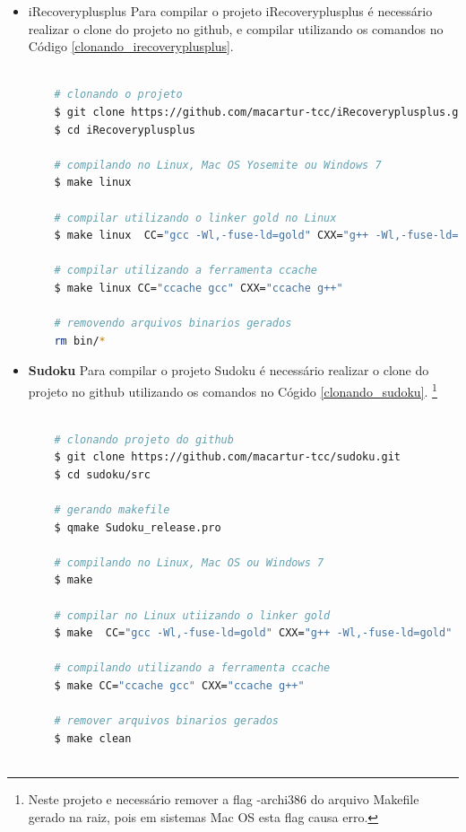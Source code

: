 \begin{itemize}
       \item {iRecoveryplusplus}
        \subitem Para compilar o projeto iRecoveryplusplus é necessário
 realizar o clone do projeto no github, e compilar utilizando os comandos no Código 
\ref{clonando_irecoveryplusplus}.


\begin{lstlisting}[language=bash, caption={Clonado e compilando o projeto iRecoveryplusplus},
                  label=clonando_irecoveryplusplus]

    # clonando o projeto
    $ git clone https://github.com/macartur-tcc/iRecoveryplusplus.git 
    $ cd iRecoveryplusplus

    # compilando no Linux, Mac OS Yosemite ou Windows 7
    $ make linux 
    
    # compilar utilizando o linker gold no Linux
    $ make linux  CC="gcc -Wl,-fuse-ld=gold" CXX="g++ -Wl,-fuse-ld=gold"

    # compilar utilizando a ferramenta ccache
    $ make linux CC="ccache gcc" CXX="ccache g++"

    # removendo arquivos binarios gerados
    rm bin/*
\end{lstlisting}

    \item \textbf{Sudoku}
    \subitem Para compilar o projeto Sudoku é necessário realizar o clone do projeto
no github utilizando os comandos no Cógido \ref{clonando_sudoku}.
\footnote{Neste projeto e necessário remover a flag -archi386 do arquivo Makefile gerado na raiz, pois em sistemas Mac OS esta flag causa erro.}

\begin{lstlisting}[language=bash, caption={Clonado e compilando o Projeto Sudoku},
                  label=clonando_sudoku]

    # clonando projeto do github 
    $ git clone https://github.com/macartur-tcc/sudoku.git 
    $ cd sudoku/src

    # gerando makefile
    $ qmake Sudoku_release.pro

    # compilando no Linux, Mac OS ou Windows 7
    $ make

    # compilar no Linux utiizando o linker gold
    $ make  CC="gcc -Wl,-fuse-ld=gold" CXX="g++ -Wl,-fuse-ld=gold"

    # compilando utilizando a ferramenta ccache
    $ make CC="ccache gcc" CXX="ccache g++"

    # remover arquivos binarios gerados
    $ make clean
    

\end{lstlisting}
\end{itemize}
